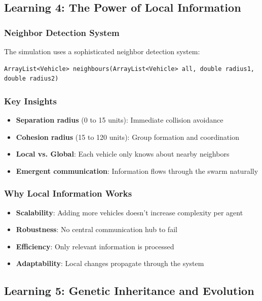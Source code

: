 \documentclass[12pt,a4paper]{article}
\begin{document}
\subsection{Learning 4: The Power of Local Information}

\subsubsection{Neighbor Detection System}
The simulation uses a sophisticated neighbor detection system:

\begin{lstlisting}
ArrayList<Vehicle> neighbours(ArrayList<Vehicle> all, double radius1, double radius2)
\end{lstlisting}

\subsubsection{Key Insights}
\begin{itemize}
    \item \textbf{Separation radius} (0 to 15 units): Immediate collision avoidance
    \item \textbf{Cohesion radius} (15 to 120 units): Group formation and coordination
    \item \textbf{Local vs. Global}: Each vehicle only knows about nearby neighbors
    \item \textbf{Emergent communication}: Information flows through the swarm naturally
\end{itemize}

\subsubsection{Why Local Information Works}
\begin{itemize}
    \item \textbf{Scalability}: Adding more vehicles doesn't increase complexity per agent
    \item \textbf{Robustness}: No central communication hub to fail
    \item \textbf{Efficiency}: Only relevant information is processed
    \item \textbf{Adaptability}: Local changes propagate through the system
\end{itemize}

\subsection{Learning 5: Genetic Inheritance and Evolution}
\end{document}
